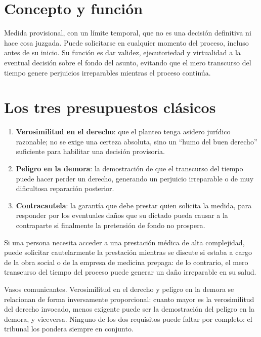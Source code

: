 \documentclass[12pt,oneside]{book}
\begin{document}
\section{Concepto y función}

\begin{defbox}
Medida provisional, con un límite temporal, que no es una decisión definitiva ni
hace cosa juzgada. Puede solicitarse en cualquier momento del proceso, incluso
antes de su inicio. Su función es dar validez, ejecutoriedad y virtualidad a la
eventual decisión sobre el fondo del asunto, evitando que el mero transcurso del
tiempo genere perjuicios irreparables mientras el proceso continúa.
\end{defbox}

\section{Los tres presupuestos clásicos}

\begin{enumerate}[leftmargin=1.6em]
  \item \textbf{Verosimilitud en el derecho}: que el planteo tenga asidero
  jurídico razonable; no se exige una certeza absoluta, sino un ``humo del buen
  derecho'' suficiente para habilitar una decisión provisoria.
  \item \textbf{Peligro en la demora}: la demostración de que el transcurso del
  tiempo puede hacer perder un derecho, generando un perjuicio irreparable o de
  muy dificultosa reparación posterior.
  \item \textbf{Contracautela}: la garantía que debe prestar quien solicita la
  medida, para responder por los eventuales daños que su dictado pueda causar a
  la contraparte si finalmente la pretensión de fondo no prospera.
\end{enumerate}

\begin{exbox}
Si una persona necesita acceder a una prestación médica de alta complejidad,
puede solicitar cautelarmente la prestación mientras se discute si estaba a cargo
de la obra social o de la empresa de medicina prepaga: de lo contrario, el mero
transcurso del tiempo del proceso puede generar un daño irreparable en su salud.
\end{exbox}

\begin{impbox}
Vasos comunicantes. Verosimilitud en el derecho y peligro en la demora se
relacionan de forma inversamente proporcional: cuanto mayor es la verosimilitud
del derecho invocado, menos exigente puede ser la demostración del peligro en la
demora, y viceversa. Ninguno de los dos requisitos puede faltar por completo: el
tribunal los pondera siempre en conjunto.
\end{impbox}
\end{document}

